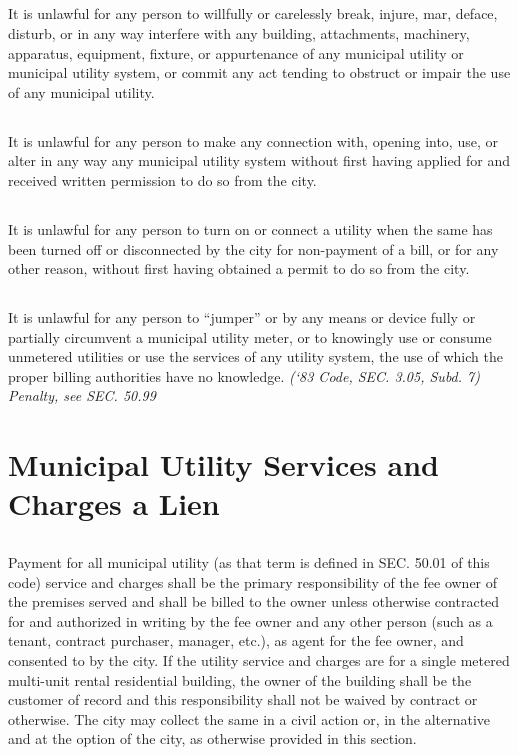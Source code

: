 \subsection{}
It is unlawful for any person to willfully or carelessly break, injure, mar, deface, disturb, or in any way interfere with any building, attachments, machinery, apparatus, equipment, fixture, or appurtenance of any municipal utility or municipal utility system, or commit any act tending to obstruct or impair the use of any municipal utility.
\subsection{}
It is unlawful for any person to make any connection with, opening into, use, or alter in any way any municipal utility system without first having applied for and received written permission to do so from the city.
\subsection{}
It is unlawful for any person to turn on or connect a utility when the same has been turned off or disconnected by the city for non-payment of a bill, or for any other reason, without first having obtained a permit to do so from the city.
\subsection{}
It is unlawful for any person to “jumper” or by any means or device fully or partially circumvent a municipal utility meter, or to knowingly use or consume unmetered utilities or use the services of any utility system, the use of which the proper billing authorities have no knowledge.\newline
\emph{(‘83 Code, SEC. 3.05, Subd. 7)  Penalty, see SEC. 50.99}
\section{Municipal Utility Services and Charges a Lien}
\subsection{}
Payment for all municipal utility (as that term is defined in SEC. 50.01 of this code) service and charges shall be the primary responsibility of the fee owner of the premises served and shall be billed to the owner unless otherwise contracted for and authorized in writing by the fee owner and any other person (such as a tenant, contract purchaser, manager, etc.), as agent for the fee owner, and consented to by the city.  If the utility service and charges are for a single metered multi-unit rental residential building, the owner of the building shall be the customer of record and this responsibility shall not be waived by contract or otherwise.  The city may collect the same in a civil action or, in the alternative and at the option of the city, as otherwise provided in this section.
